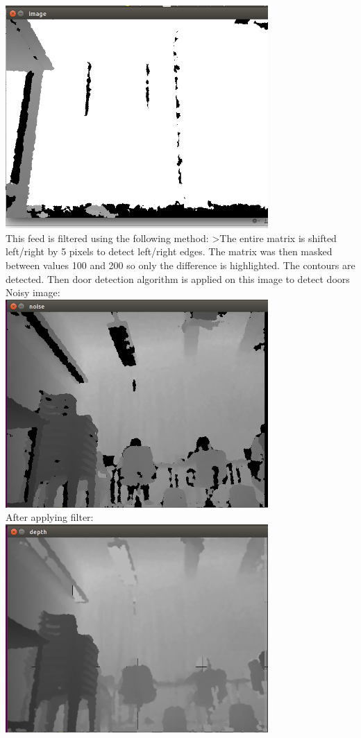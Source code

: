 \documentclass{report}
\begin{document}
\includegraphics[width = 10cm]{d_3bit.png} \\

This feed is filtered using the following method:
>The entire matrix is shifted left/right by 5 pixels to detect left/right edges. The matrix was then masked between values 100 and 200 so only the difference is highlighted. The contours are detected. Then
door detection algorithm is applied on this image to detect doors \\

Noisy image: \\ 
\includegraphics[width = 10cm]{Noise.png} \\
After applying filter: \\
\includegraphics[width = 10cm]{Noiseless.png} \\
\end{document}
